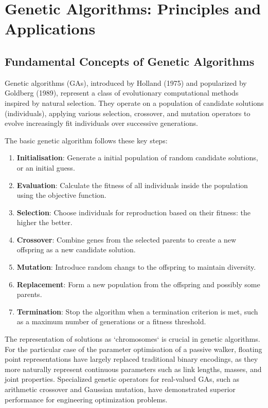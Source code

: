 \section{Genetic Algorithms: Principles and Applications}
\label{sec:genetic_algorithms}
\subsection{Fundamental Concepts of Genetic Algorithms}
Genetic algorithms (GAs), introduced by Holland (1975) and popularized by Goldberg (1989), represent a class of evolutionary computational methods inspired by natural selection.
They operate on a population of candidate solutions (individuals), applying various selection, crossover, and mutation operators to evolve increasingly fit individuals over successive generations.

The basic genetic algorithm follows these key steps:
\begin{enumerate}
    \item \textbf{Initialisation}: Generate a initial population of random candidate solutions, or an initial guess.
    \item \textbf{Evaluation}: Calculate the fitness of all individuals inside the population using the objective function.
    \item \textbf{Selection}: Choose individuals for reproduction based on their fitness: the higher the better.
    \item \textbf{Crossover}: Combine genes from the selected parents to create a new offspring as a new candidate solution.
    \item \textbf{Mutation}: Introduce random changs to the offspring to maintain diversity.
    \item \textbf{Replacement}: Form a new population from the offspring and possibly some parents.
    \item \textbf{Termination}: Stop the algorithm when a termination criterion is met, such as a maximum number of generations or a fitness threshold.
\end{enumerate}

The representation of solutions as `chromosomes` is crucial in genetic algorithms.
For the particular case of the parameter optimisation of a passive walker, floating point representations have largely replaced traditional binary encodings, as they more naturally represent continuous parameters such as link lengths, masses, and joint properties.
Specialized genetic operators for real-valued GAs, such as arithmetic crossover and Gaussian mutation, have demonstrated superior performance for engineering optimization problems\cite{Deb1995}.

